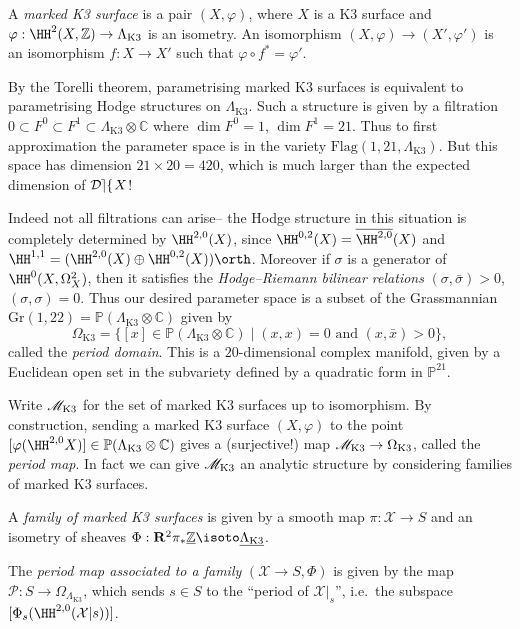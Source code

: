 \begin{definition}
    A \textit{marked K3 surface} is a pair \((X,\varphi)\), where \(X\) is a K3
    surface and \(\varphi:\HH^2(X,\mathbb{Z})\to \Lambda_\text{K3}\) is an
    isometry. An isomorphism \((X,\varphi)\to (X',\varphi')\) is an isomorphism
    \(f:X\to X'\) such that \(\varphi\circ f^\ast = \varphi'\).
\end{definition}

By the Torelli theorem, parametrising marked K3 surfaces is equivalent to
parametrising Hodge structures on \(\Lambda_\text{K3}\). Such a structure is
given by a filtration \(0\subset F^0\subset F^1\subset \Lambda_\text{K3}\otimes
\mathbb{C}\) where
\(\dim F^0=1\), \(\dim F^1=21\). Thus to first approximation the parameter space
is in the variety \(\text{Flag}(1,21,\Lambda_\text{K3})\). But this space has
dimension \(21\times 20=420\), which is much larger than the expected dimension of \(\mathop{\mathcal{D\kern -0.5pt e\kern -0.5pt f\kern -1pt}} X\)!

Indeed not all filtrations can arise-- the Hodge structure in this situation is
completely determined by \(\HH^{2,0}(X)\), since
\(\HH^{0,2}(X)=\overline{\HH^{2,0}}(X)\) and \(\HH^{1,1}=(\HH^{2,0}(X)\oplus
\HH^{0,2}(X))\orth\). Moreover if \(\sigma\) is a generator of
\(\HH^0(X,\Omega^2_X)\), then it satisfies the \textit{Hodge--Riemann bilinear
relations} \((\sigma,\bar\sigma) > 0\), \((\sigma ,\sigma) = 0\). Thus our
desired parameter space is a subset of the Grassmannian
\(\text{Gr}(1,22)=\mathbb{P}(\Lambda_\text{K3}\otimes \mathbb{C})\) given by
\[\Omega_\text{K3}=\{[x]\in \mathbb{P}(\Lambda_\text{K3}\otimes \mathbb{C})
\;|\; (x,x)=0 \text{ and }(x,\bar x)>0\},\] called the \textit{period domain}.
This is a \(20\)-dimensional complex manifold, given by a Euclidean open set in
the subvariety defined by a quadratic form in \(\mathbb{P}^{21}\).

Write \(\mathscr{M}_\text{K3}\) for the set of marked K3 surfaces up to isomorphism. By construction, sending a marked K3 surface \((X,\varphi)\) to the point
\([\varphi(\HH^{2,0}X)]\in \mathbb{P}(\Lambda_{\text{K3}}\otimes \mathbb{C})\)
gives a (surjective!) map \(\mathscr{M}_\textnormal{K3}\to \Omega_\textnormal{K3}\),
called the \textit{period map}. In fact we can give \(\mathscr{M}_\textnormal{K3}\)
an analytic structure by considering families of marked K3 surfaces.

\begin{definition}
    A \textit{family of marked K3 surfaces} is given by a smooth map
    \(\pi:\mathcal{X}\to S\) and an isometry of sheaves \(\Phi:
    \mathbf{R}^2\pi_\ast \underline{\mathbb{Z}}\isoto
    \underline{\Lambda_\text{K3}}\).

    The \textit{period map associated to a family} \((\mathcal{X}\to
    S,\Phi)\) is given by the map \(\mathcal{P}:S\to
    \Omega_{\Lambda_\text{K3}}\), which sends \(s\in S\) to the ``period of
    \(\mathcal{X}|_s\)'', i.e.\ the subspace
    \([\Phi_s(\HH^{2,0}(\mathcal{X}|s))]\).
\end{definition}

